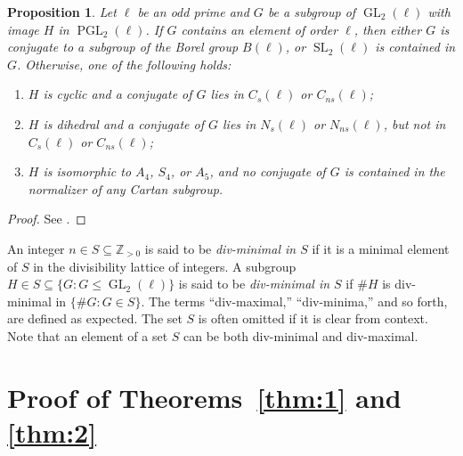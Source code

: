 \documentclass[table,dvipsnames]{amsart}
\newcommand{\SL}{\operatorname{SL}}
\newcommand{\GL}{\operatorname{GL}}
\newcommand{\PGL}{\operatorname{PGL}}
\newcommand{\Z}{\mathbb{Z}}
\newtheorem{proposition}[theorem]{Proposition}
\numberwithin{equation}{section}
\newcommand{\s}{\textit{s}}
\newcommand{\ns}{\textit{ns}}
\newcommand{\Cs}{C_\s}
\newcommand{\Cns}{C_\ns}
\newcommand{\Ns}{N_\s}
\newcommand{\Nns}{N_\ns}
\begin{document}
\begin{proposition}
\label{prop:subs}
Let $\ell$ be an odd prime and $G$ be a subgroup of $\GL_2(\ell)$ with image $H$ in $\PGL_2(\ell)$. If $G$ contains an element of order $\ell$, then either $G$ is conjugate to a subgroup of the Borel group $B(\ell)$, or $\SL_2(\ell)$ is contained in $G$. Otherwise, one of the following holds:
\begin{enumerate}
\item $H$ is cyclic and a conjugate of $G$ lies in $\Cs(\ell)$ or $\Cns(\ell)$;
\item $H$ is dihedral and a conjugate of $G$ lies in $\Ns(\ell)$ or $\Nns(\ell)$, but not in $\Cs(\ell)$ or $\Cns(\ell)$;
\item $H$ is isomorphic to $A_4$, $S_4$, or $A_5$, and no conjugate of $G$ is contained in the normalizer of any Cartan subgroup.
\end{enumerate}
\end{proposition}
\begin{proof}
See \cite[\S2]{serre1972}.
\end{proof}

An integer $n\in S\subseteq\Z_{>0}$ is said to be \emph{div-minimal in $S$} if it is a minimal element of $S$ in the divisibility lattice of integers. A subgroup $H\in S\subseteq\{G:G\le\GL_2(\ell)\}$ is said to be \emph{div-minimal in $S$} if $\#H$ is div-minimal in $\{\#G:G\in S\}$. The terms ``div-maximal,'' ``div-minima,'' and so forth, are defined as expected. The set $S$ is often omitted if it is clear from context. Note that an element of a set $S$ can be both div-minimal and div-maximal.

\section{Proof of Theorems~\ref{thm:1} and \ref{thm:2}}
\end{document}
